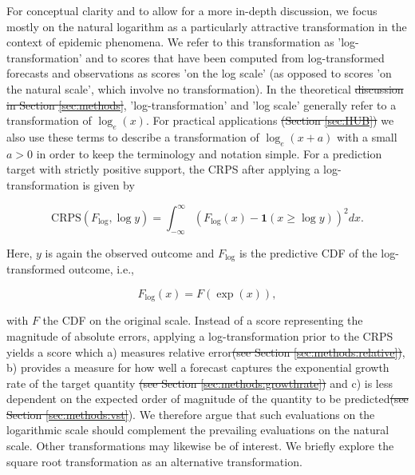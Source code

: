 \documentclass[10pt,letterpaper]{article} %
\providecommand{\DIFaddtex}[1]{{\protect\color{blue}\uwave{#1}}} %
\providecommand{\DIFdeltex}[1]{{\protect\color{red}\sout{#1}}}                      %
\providecommand{\DIFaddbegin}{} %
\providecommand{\DIFaddend}{} %
\providecommand{\DIFdelbegin}{} %
\providecommand{\DIFdelend}{} %
\providecommand{\DIFadd}[1]{\texorpdfstring{\DIFaddtex{#1}}{#1}} %
\providecommand{\DIFdel}[1]{\texorpdfstring{\DIFdeltex{#1}}{}} %
\newcommand{\DIFscaledelfig}{0.5}
\newlength{\DIFdelgraphicswidth} %
\newlength{\DIFdelgraphicsheight} %
\newcommand{\DIFaddincludegraphics}[2][]{{\color{blue}\fbox{\DIFOincludegraphics[#1]{#2}}}} %
\newcommand{\DIFdelincludegraphics}[2][]{%
\sbox{\DIFdelgraphicsbox}{\DIFOincludegraphics[#1]{#2}}%
\settoboxwidth{\DIFdelgraphicswidth}{\DIFdelgraphicsbox} %
\settoboxtotalheight{\DIFdelgraphicsheight}{\DIFdelgraphicsbox} %
\scalebox{\DIFscaledelfig}{%
\parbox[b]{\DIFdelgraphicswidth}{\usebox{\DIFdelgraphicsbox}\\[-\baselineskip] \rule{\DIFdelgraphicswidth}{0em}}\llap{\resizebox{\DIFdelgraphicswidth}{\DIFdelgraphicsheight}{%
\setlength{\unitlength}{\DIFdelgraphicswidth}%
\begin{picture}(1,1)%
\thicklines\linethickness{2pt} %
{\color[rgb]{1,0,0}\put(0,0){\framebox(1,1){}}}%
{\color[rgb]{1,0,0}\put(0,0){\line( 1,1){1}}}%
{\color[rgb]{1,0,0}\put(0,1){\line(1,-1){1}}}%
\end{picture}%
}\hspace*{3pt}}} %
} %
\DeclareRobustCommand{\DIFaddbegin}{\DIFOaddbegin \let\includegraphics\DIFaddincludegraphics} %
\DeclareRobustCommand{\DIFaddend}{\DIFOaddend \let\includegraphics\DIFOincludegraphics} %
\DeclareRobustCommand{\DIFdelbegin}{\DIFOdelbegin \let\includegraphics\DIFdelincludegraphics} %
\DeclareRobustCommand{\DIFdelend}{\DIFOaddend \let\includegraphics\DIFOincludegraphics} %
\begin{document}
For conceptual clarity and to allow for a more in-depth discussion, we focus mostly on the natural logarithm as a particularly attractive transformation in the context of epidemic phenomena. We refer to this transformation as 'log-transformation' and to scores that have been computed from log-transformed forecasts and observations as scores 'on the log scale' (as opposed to scores 'on the natural scale', which involve no transformation). In the theoretical \DIFdelbegin \DIFdel{discussion in Section \ref{sec:methods}}\DIFdelend \DIFaddbegin \DIFadd{part of the paper}\DIFaddend , 'log-transformation' and 'log scale' generally refer to a transformation of $\log_{e}(x)$. For practical applications \DIFdelbegin \DIFdel{(Section \ref{sec:HUB}) }\DIFdelend \DIFaddbegin \DIFadd{in the later sections }\DIFaddend we also use these terms to describe a transformation of $\log_{e}(x + a)$ with a small $a > 0$ in order to keep the terminology and notation simple. For a prediction target with strictly positive support, the CRPS after applying a log-transformation is given by
%
\begin{linenomath*}
\begin{equation}
    \text{CRPS}(F_{\log}, \log y) = \int_{-\infty}^\infty \left( F_{\log}(x) - \boldsymbol{1}(x \geq \log y) \right)^2 dx.
\end{equation}    
\end{linenomath*}
%
Here, $y$ is again the observed outcome and $F_{\log}$ is the predictive CDF of the log-transformed outcome, i.e.,
\begin{linenomath*}
\begin{equation}
F_{\log}(x) = F(\exp(x)),
\end{equation}    
\end{linenomath*}
with $F$ the CDF on the original scale. Instead of a score representing the magnitude of absolute errors, applying a log-transformation prior to the CRPS yields a score which a) measures relative error\DIFdelbegin \DIFdel{(see Section \ref{sec:methods:relative})}\DIFdelend , b) provides a measure for how well a forecast captures the exponential growth rate of the target quantity \DIFdelbegin \DIFdel{(see Section \ref{sec:methods:growthrate}) }\DIFdelend and c) is less dependent on the expected order of magnitude of the quantity to be predicted\DIFdelbegin \DIFdel{(see Section \ref{sec:methods:vst}}\DIFdelend ). 
We therefore argue that such evaluations on the logarithmic scale should complement the prevailing evaluations on the natural scale. 
Other transformations may likewise be of interest. We briefly explore the square root transformation as an alternative transformation. 
\end{document}
